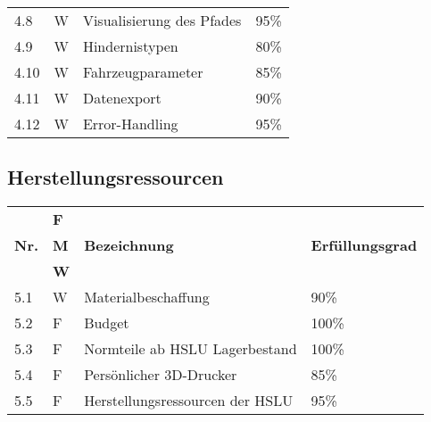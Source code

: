 \documentclass[main.tex]{subfiles} %
\begin{document}
\begin{tabular}{|l|p{0.5cm}|p{4cm}|p{10cm}|}
  4.8          & W              & Visualisierung des Pfades    & 95\%                    \\
  4.9          & W              & Hindernistypen               & 80\%                    \\
  4.10          & W              & Fahrzeugparameter            & 85\%                    \\
  4.11         & W              & Datenexport                  & 90\%                    \\
  4.12         & W              & Error-Handling               & 95\%                    \\
  \hline
\end{tabular}

\subsection*{Herstellungsressourcen}

\begin{tabular}{|l|p{0.5cm}|p{4cm}|p{10cm}|}
  \hline
               & \textbf{F} &                                  &                                                                                                                                                                                                                                                                                                                                                                                 \\
  \textbf{Nr.} & \textbf{M} & \textbf{Bezeichnung}             & \textbf{Erfüllungsgrad}                                                                                                                                                                                                                                                                                                                                                                                \\
               & \textbf{W} &                                  &                                                                                                                                                                                                                                                                                                                                                                         \\
  \hline
  5.1          & W              & Materialbeschaffung          & 90\%                    \\
  5.2          & F              & Budget                       & 100\%                   \\
  5.3          & F              & Normteile ab HSLU Lagerbestand & 100\%                 \\
  5.4          & F              & Persönlicher 3D-Drucker      & 85\%                    \\
  5.5          & F              & Herstellungsressourcen der HSLU & 95\%                  \\
  \hline
\end{tabular}


\newpage
\end{document}
